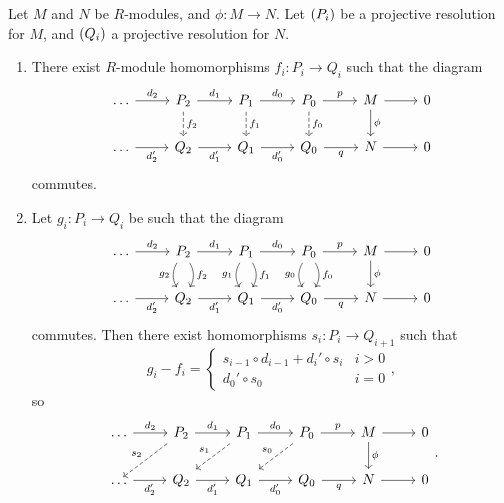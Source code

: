 \begin{proposition}
\label{prop:projectiveresolution}
Let $ M $ and $ N $ be $ R $-modules, and $ \phi : M \to N $. Let $ \br{P_i} $ be a projective resolution for $ M $, and $ \br{Q_i} $ a projective resolution for $ N $.
\begin{enumerate}
\item There exist $ R $-module homomorphisms $ f_i : P_i \to Q_i $ such that the diagram
$$
\begin{tikzcd}
\dots \arrow{r}{d_2} & P_2 \arrow{r}{d_1} \arrow[dashed]{d}{f_2} & P_1 \arrow{r}{d_0} \arrow[dashed]{d}{f_1} & P_0 \arrow{r}{p} \arrow[dashed]{d}{f_0} & M \arrow{r} \arrow{d}{\phi} & 0 \\
\dots \arrow[swap]{r}{d_2'} & Q_2 \arrow[swap]{r}{d_1'} & Q_1 \arrow[swap]{r}{d_0'} & Q_0 \arrow[swap]{r}{q} & N \arrow{r} & 0
\end{tikzcd}
$$
commutes.
\item Let $ g_i : P_i \to Q_i $ be such that the diagram
$$
\begin{tikzcd}
\dots \arrow{r}{d_2} & P_2 \arrow{r}{d_1} \arrow[bend right=30, swap]{d}{g_2} \arrow[bend left=30]{d}{f_2} & P_1 \arrow{r}{d_0} \arrow[bend right=30, swap]{d}{g_1} \arrow[bend left=30]{d}{f_1} & P_0 \arrow{r}{p} \arrow[bend right=30, swap]{d}{g_0} \arrow[bend left=30]{d}{f_0} & M \arrow{r} \arrow{d}{\phi} & 0 \\
\dots \arrow[swap]{r}{d_2'} & Q_2 \arrow[swap]{r}{d_1'} & Q_1 \arrow[swap]{r}{d_0'} & Q_0 \arrow[swap]{r}{q} & N \arrow{r} & 0
\end{tikzcd}
$$
commutes. Then there exist homomorphisms $ s_i : P_i \to Q_{i + 1} $ such that
$$ g_i - f_i =
\begin{cases}
s_{i - 1} \circ d_{i - 1} + d_i' \circ s_i & i > 0 \\
d_0' \circ s_0 & i = 0
\end{cases},
$$
so
$$
\begin{tikzcd}
\dots \arrow{r}{d_2} & P_2 \arrow{r}{d_1} \arrow[dashed, swap]{dl}{s_2} & P_1 \arrow{r}{d_0} \arrow[dashed, swap]{dl}{s_1} & P_0 \arrow{r}{p} \arrow[dashed, swap]{dl}{s_0} & M \arrow{r} \arrow{d}{\phi} & 0 \\
\dots \arrow[swap]{r}{d_2'} & Q_2 \arrow[swap]{r}{d_1'} & Q_1 \arrow[swap]{r}{d_0'} & Q_0 \arrow[swap]{r}{q} & N \arrow{r} & 0
\end{tikzcd}.
$$
\end{enumerate}
\end{proposition}

\pagebreak

